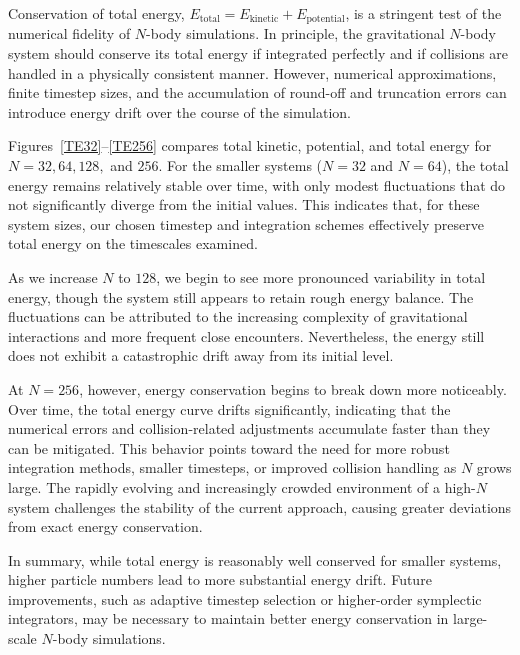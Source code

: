 \documentclass[a4paper, 12pt, oneside, onecolumn]{article}
\begin{document}
\begin{multicols}{2}

Conservation of total energy, $E_{\text{total}} = E_{\text{kinetic}} + E_{\text{potential}}$, is a stringent test of the numerical fidelity of $N$-body simulations. In principle, the gravitational $N$-body system should conserve its total energy if integrated perfectly and if collisions are handled in a physically consistent manner. However, numerical approximations, finite timestep sizes, and the accumulation of round-off and truncation errors can introduce energy drift over the course of the simulation.

Figures~\ref{TE32}--\ref{TE256} compares total kinetic, potential, and total energy for $N = 32, 64, 128,$ and $256$. For the smaller systems ($N = 32$ and $N = 64$), the total energy remains relatively stable over time, with only modest fluctuations that do not significantly diverge from the initial values. This indicates that, for these system sizes, our chosen timestep and integration schemes effectively preserve total energy on the timescales examined.

As we increase $N$ to $128$, we begin to see more pronounced variability in total energy, though the system still appears to retain rough energy balance. The fluctuations can be attributed to the increasing complexity of gravitational interactions and more frequent close encounters. Nevertheless, the energy still does not exhibit a catastrophic drift away from its initial level.

At $N = 256$, however, energy conservation begins to break down more noticeably. Over time, the total energy curve drifts significantly, indicating that the numerical errors and collision-related adjustments accumulate faster than they can be mitigated. This behavior points toward the need for more robust integration methods, smaller timesteps, or improved collision handling as $N$ grows large. The rapidly evolving and increasingly crowded environment of a high-$N$ system challenges the stability of the current approach, causing greater deviations from exact energy conservation.

In summary, while total energy is reasonably well conserved for smaller systems, higher particle numbers lead to more substantial energy drift. Future improvements, such as adaptive timestep selection or higher-order symplectic integrators, may be necessary to maintain better energy conservation in large-scale $N$-body simulations.






\end{multicols}
\end{document}
